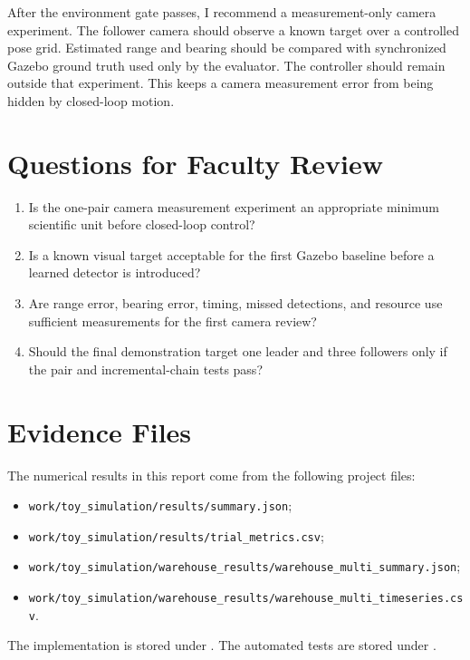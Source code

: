 \documentclass[10pt,onecolumn]{IEEEtran}
\begin{document}
After the environment gate passes, I recommend a measurement-only camera experiment.
The follower camera should observe a known target over a controlled pose grid.
Estimated range and bearing should be compared with synchronized Gazebo ground truth used only by the evaluator.
The controller should remain outside that experiment.
This keeps a camera measurement error from being hidden by closed-loop motion.

\section{Questions for Faculty Review}

\begin{enumerate}
    \item Is the one-pair camera measurement experiment an appropriate minimum scientific unit before closed-loop control?
    \item Is a known visual target acceptable for the first Gazebo baseline before a learned detector is introduced?
    \item Are range error, bearing error, timing, missed detections, and resource use sufficient measurements for the first camera review?
    \item Should the final demonstration target one leader and three followers only if the pair and incremental-chain tests pass?
\end{enumerate}

\section{Evidence Files}

The numerical results in this report come from the following project files:

\begin{itemize}
    \item \texttt{work/toy\_simulation/results/summary.json};
    \item \texttt{work/toy\_simulation/results/trial\_metrics.csv};
    \item \texttt{work/toy\_simulation/warehouse\_results/warehouse\_multi\_summary.json};
    \item \texttt{work/toy\_simulation/warehouse\_results/warehouse\_multi\_timeseries.csv}.
\end{itemize}

The implementation is stored under .
The automated tests are stored under .



\end{document}
